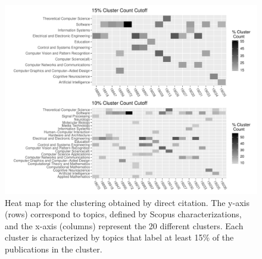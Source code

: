 \begin{figure}[ht]
  \includegraphics[scale=0.45]{scopus_dblp_heatmap3.pdf}
\caption{Heat map for the clustering obtained by direct citation. The  y-axis (rows) correspond to topics, defined by Scopus characterizations, and the
x-axis (columns) represent the 20 different clusters.  
Each cluster is characterized by topics that label at least 15\% of the publications in the cluster.
 }
\label{fig:heatmap_cocit}       %
\end{figure}
\newpage

\newpage


